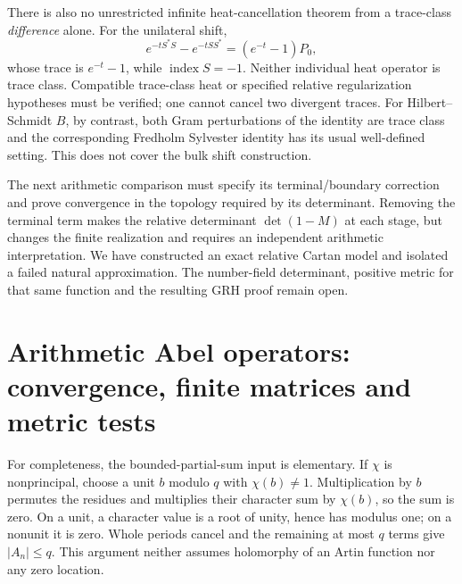 There is also no unrestricted infinite heat-cancellation theorem from a trace-class \emph{difference} alone. For the unilateral shift,
\[
 e^{-tS^*S}-e^{-tSS^*}=(e^{-t}-1)P_0,
\]
whose trace is $e^{-t}-1$, while $\operatorname{index}S=-1$. Neither individual heat operator is trace class. Compatible trace-class heat or specified relative regularization hypotheses must be verified; one cannot cancel two divergent traces. For Hilbert--Schmidt $B$, by contrast, both Gram perturbations of the identity are trace class and the corresponding Fredholm Sylvester identity has its usual well-defined setting. This does not cover the bulk shift construction.

The next arithmetic comparison must specify its terminal/boundary correction and prove convergence in the topology required by its determinant. Removing the terminal term makes the relative determinant $\det(1-M)$ at each stage, but changes the finite realization and requires an independent arithmetic interpretation. We have constructed an exact relative Cartan model and isolated a failed natural approximation. The number-field determinant, positive metric for that same function and the resulting GRH proof remain open.

\section{Arithmetic Abel operators: convergence, finite matrices and metric tests}
For completeness, the bounded-partial-sum input is elementary. If $\chi$ is nonprincipal, choose a unit $b$ modulo $q$ with $\chi(b)\ne1$. Multiplication by $b$ permutes the residues and multiplies their character sum by $\chi(b)$, so the sum is zero. On a unit, a character value is a root of unity, hence has modulus one; on a nonunit it is zero. Whole periods cancel and the remaining at most $q$ terms give $|A_n|\le q$. This argument neither assumes holomorphy of an Artin function nor any zero location.


